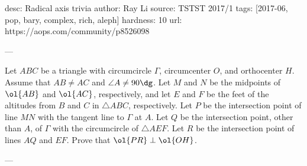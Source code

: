 desc: Radical axis trivia
author: Ray Li
source: TSTST 2017/1
tags: [2017-06, pop, bary, complex, rich, aleph]
hardness: 10
url: https://aops.com/community/p8526098

---

Let $ABC$ be a triangle with circumcircle $\Gamma$,
circumcenter $O$, and orthocenter $H$.
Assume that $AB \neq AC$ and $\angle A \neq 90\dg$.
Let $M$ and $N$ be the midpoints of $\ol{AB}$ and $\ol{AC}$,
respectively, and let $E$ and $F$ be the feet of the altitudes
from $B$ and $C$ in $\triangle ABC$, respectively.
Let $P$ be the intersection point of line $MN$
with the tangent line to $\Gamma$ at $A$.
Let $Q$ be the intersection point,
other than $A$, of $\Gamma$ with the circumcircle of $\triangle AEF$.
Let $R$ be the intersection point of lines $AQ$ and $EF$.
Prove that $\ol{PR} \perp \ol{OH}$.

---

